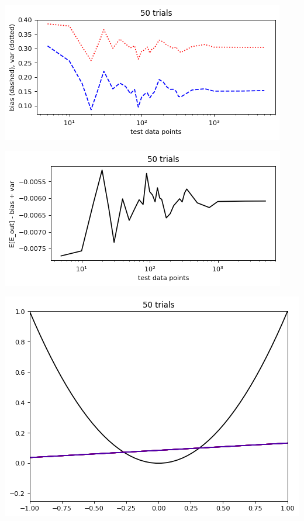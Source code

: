 \documentclass[12pt]{article}
\begin{document}
\pagebreak        
{}
        \begin{center}\includegraphics[width=0.6\linewidth]{png/50_trials_bias-var.png}\end{center}
        \begin{center}\includegraphics[width=0.6\linewidth]{png/50_trials_diff.png}\end{center}
        \begin{center}\includegraphics[width=0.58\linewidth]{png/50_trials.png}\end{center}
        
\end{document}
